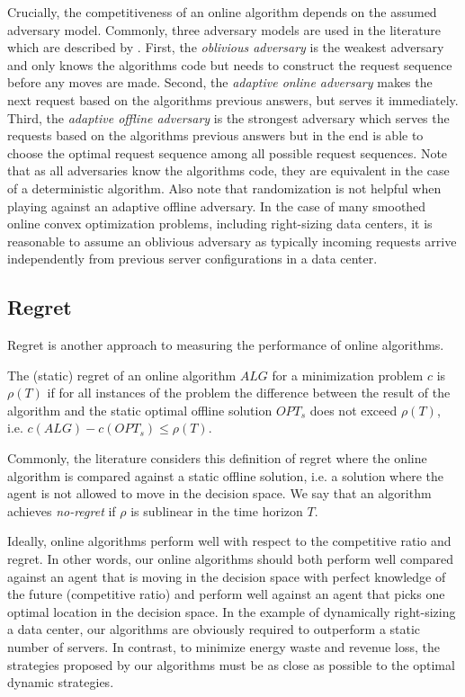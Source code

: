 Crucially, the competitiveness of an online algorithm depends on the assumed adversary model. Commonly, three adversary models are used in the literature which are described by \citeauthor{Borodin1990} \cite{Borodin1990}. First, the \emph{oblivious adversary} is the weakest adversary and only knows the algorithms code but needs to construct the request sequence before any moves are made. Second, the \emph{adaptive online adversary} makes the next request based on the algorithms previous answers, but serves it immediately. Third, the \emph{adaptive offline adversary} is the strongest adversary which serves the requests based on the algorithms previous answers but in the end is able to choose the optimal request sequence among all possible request sequences. Note that as all adversaries know the algorithms code, they are equivalent in the case of a deterministic algorithm. Also note that randomization is not helpful when playing against an adaptive offline adversary. In the case of many smoothed online convex optimization problems, including right-sizing data centers, it is reasonable to assume an oblivious adversary as typically incoming requests arrive independently from previous server configurations in a data center.

\subsection{Regret}

Regret is another approach to measuring the performance of online algorithms.

\begin{definition}
The (static) regret of an online algorithm $ALG$ for a minimization problem $c$ is $\rho(T)$ if for all instances of the problem the difference between the result of the algorithm and the static optimal offline solution $OPT_s$ does not exceed $\rho(T)$, i.e. $c(ALG) - c(OPT_s) \leq \rho(T)$.
\end{definition}

Commonly, the literature considers this definition of regret where the online algorithm is compared against a static offline solution, i.e. a solution where the agent is not allowed to move in the decision space. We say that an algorithm achieves \emph{no-regret} if $\rho$ is sublinear in the time horizon $T$.

Ideally, online algorithms perform well with respect to the competitive ratio and regret. In other words, our online algorithms should both perform well compared against an agent that is moving in the decision space with perfect knowledge of the future (competitive ratio) and perform well against an agent that picks one optimal location in the decision space. In the example of dynamically right-sizing a data center, our algorithms are obviously required to outperform a static number of servers. In contrast, to minimize energy waste and revenue loss, the strategies proposed by our algorithms must be as close as possible to the optimal dynamic strategies.

